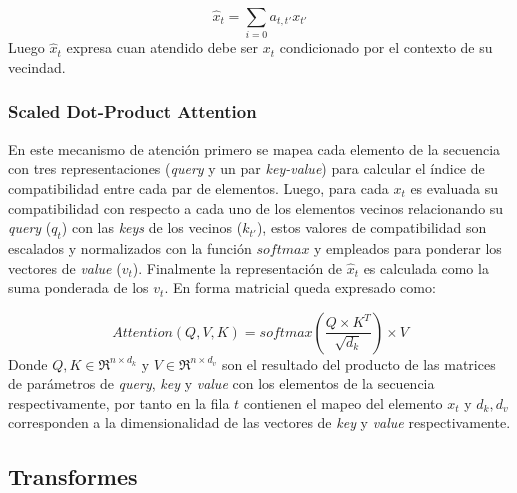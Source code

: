 		\begin{equation} \label{attention}
			\hat{x}_t = \sum \limits_{i=0} a_{t,t'}x_{t'}
		\end{equation}
		Luego $\hat{x}_t$ expresa cuan atendido debe ser $x_t$ condicionado por el contexto de su vecindad.
	
	\subsubsection{Scaled Dot-Product Attention}
		
		En este mecanismo de atención primero se mapea cada elemento de la secuencia con tres representaciones (\textit{query} y un par \textit{key-value}) para calcular el índice de compatibilidad entre cada par de elementos. Luego, para cada $x_t$ es evaluada su compatibilidad con respecto a cada uno de los  elementos vecinos relacionando su \textit{query} ($q_t$) con las \textit{keys} de los vecinos ($k_{t'}$), estos valores de compatibilidad son escalados y normalizados con la función $softmax$ y empleados para ponderar los vectores de \textit{value} ($v_t$). Finalmente la representación de $\hat{x}_t$ es calculada como la suma ponderada de los $v_t$. En forma matricial queda expresado como:
		
		\begin{equation}
			Attention(Q, V, K) = softmax(\frac{Q\times K^T}{\sqrt{d_k}})\times V
			\label{dotP-att}
		\end{equation} 
		Donde $Q, K \in \Re^{n\times d_k} \text{ y } V \in \Re^{n\times d_v} $ son el resultado del producto de las matrices de parámetros de \textit{query}, \textit{key} y \textit{value} con los elementos de la secuencia respectivamente, por tanto en la fila $t$ contienen el mapeo del elemento $x_t$ y  $d_k,d_v$ corresponden a la dimensionalidad de las vectores de \textit{key} y \textit{value} respectivamente.
		
\subsection{Transformes}

